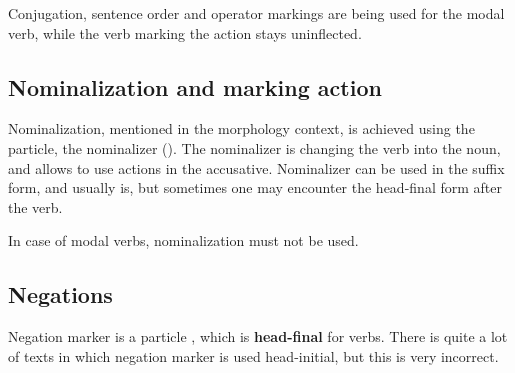 
Conjugation, sentence order and operator markings are being used for the modal
verb, while the verb marking the action stays uninflected.



\subsection{Nominalization and marking action}

Nominalization, mentioned in the morphology context, is achieved using the
 particle, the nominalizer (\Nmlz{}). The nominalizer is changing the
verb into the noun, and allows to use actions in the accusative. Nominalizer can
be used in the suffix form, and usually is, but sometimes one may encounter the
head-final form after the verb.



In case of modal verbs, nominalization must not be used.

\subsection{Negations}

Negation marker is a particle , which is \textbf{head-final} for
verbs. There is quite a lot of texts in which negation marker is used
head-initial, but this is very incorrect.




